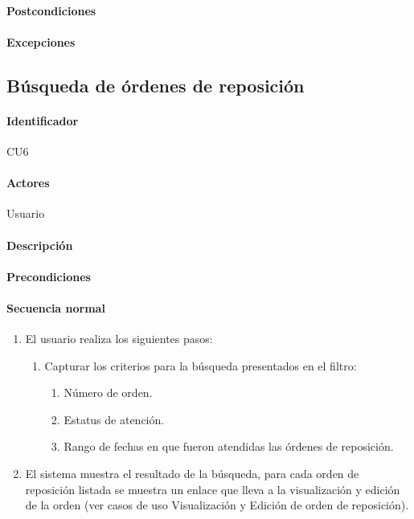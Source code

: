 \paragraph{Postcondiciones}
\paragraph{Excepciones}


\subsection{Búsqueda de órdenes de reposición}
\paragraph{Identificador}
CU6
\paragraph{Actores}
Usuario
\paragraph{Descripción}
\paragraph{Precondiciones}
\paragraph{Secuencia normal}
\begin{enumerate}
  \item El usuario realiza los siguientes pasos:
  \begin{enumerate}
    \item Capturar los criterios para la búsqueda presentados en el filtro:
    \begin{enumerate}
      \item Número de orden.
      \item Estatus de atención.
      \item Rango de fechas en que fueron atendidas las órdenes de reposición.
    \end{enumerate}
  \end{enumerate}
  \item El sistema muestra el resultado de la búsqueda, para cada orden de reposición listada se muestra un enlace que lleva a la visualización y edición de la orden (ver casos de uso Visualización y Edición de orden de reposición).

\end{enumerate}
